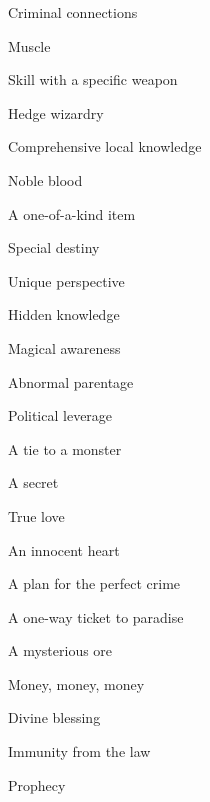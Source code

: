 \startitemize[n,packed]

\item Criminal connections

 
\item Muscle

 
\item Skill with a specific weapon

 
\item Hedge wizardry

 
\item Comprehensive local knowledge

 
\item Noble blood

 
\item A one-of-a-kind item

 
\item Special destiny

 
\item Unique perspective

 
\item Hidden knowledge

 
\item Magical awareness

 
\item Abnormal parentage

 
\item Political leverage

 
\item A tie to a monster

 
\item A secret

 
\item True love

 
\item An innocent heart

 
\item A plan for the perfect crime

 
\item A one-way ticket to paradise

 
\item A mysterious ore

 
\item Money, money, money

 
\item Divine blessing

 
\item Immunity from the law

 
\item Prophecy


